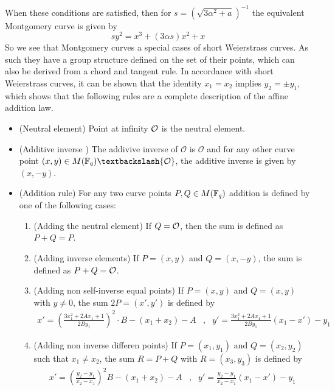 When these conditions are satisfied, then for $s=({\sqrt{3\alpha^{2}+a}})^{-1}$ the equivalent Montgomery curve is given by
$$
sy^{2}=x^{3}+(3\alpha s)x^{2}+x
$$
So we see that Montgomery curves a special cases of short Weierstrass curves. As such they have a group structure defined on the set of their points, which can also be derived from a chord and tangent rule. In accordance with short Weierstrass curves, it can be shown that the identity $x_1=x_2$ implies $y_2=\pm y_1$, which shows that the following rules are a complete description of the affine addition law.
\begin{itemize}
\item (Neutral element) Point at infinity $\mathcal{O}$ is the neutral element.
\item (Additive inverse ) The addivive inverse of $\mathcal{O}$ is $\mathcal{O}$ and for any other curve point $(x,y) \in M(\F_q)\textbackslash \{\mathcal{O}\}$, the additive inverse is given by $(x,-y)$.
\item (Addition rule) For any two curve points $P, Q \in M(\mathbb{F}_q)$ addition is defined by one of the following cases:
\begin{enumerate}
\item (Adding the neutral element) If $Q=\mathcal{O}$, then the sum is defined as $P+Q=P$.
\item (Adding inverse elements)  If $P=(x,y)$ and $Q=(x,-y)$, the sum is defined as $P+Q=\mathcal{O}$.
\item (Adding non self-inverse equal points) If $P=(x,y)$ and $Q=(x,y)$ with $y\neq 0$, the sum $2P=(x',y')$ is defined by
$$
\begin{array}{llr}
x' = (\frac{3x_1^2 + 2A x_1 +1}{2By_1})^2\cdot B - (x_1 + x_2) - A &,&
y' = \frac{3x_1^2 + 2A x_1 +1}{2By_1}(x_1-x') - y_1
\end{array} 
$$
\item (Adding non inverse differen points) If $P=(x_1,y_1)$ and $Q=(x_2,y_2)$ such that $x_1 \neq x_2$, the sum $R=P+Q$ with $R=(x_3,y_3)$ is defined by
$$
\begin{array}{llr}
x' = (\frac{y_2-y_1}{x_2-x_1})^2B - (x_1 + x_2) - A &, &
y' = \frac{y_2-y_1}{x_2-x_1}(x_1-x') - y_1
\end{array} 
$$
\end{enumerate}
\end{itemize} 
